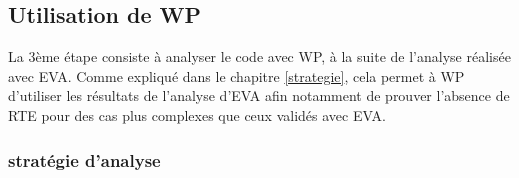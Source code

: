 



\subsection{Utilisation de WP}

La 3ème étape consiste à analyser le code avec WP, à la suite de l'analyse réalisée avec EVA. Comme expliqué dans le chapitre \ref{strategie}, cela permet à WP d'utiliser les résultats de l'analyse d'EVA afin notamment de prouver l'absence de RTE pour des cas plus complexes que ceux validés avec EVA.

\subsubsection{stratégie d'analyse}


